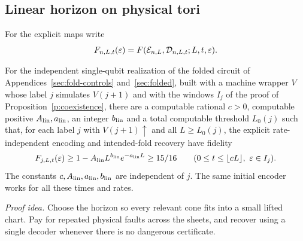 \subsection{Linear horizon on physical tori}

For the explicit maps write
\[
 F_{n,L,t}(\varepsilon)=F(\mathcal E_{n,L},\mathcal D_{n,L,t};L,t,\varepsilon).
\]

\begin{proposition}\label{q:linear}
For the independent single-qubit realization of the folded circuit of
Appendices~\ref{sec:fold-controls} and~\ref{sec:folded}, built with a
machine wrapper \(V\) whose label \(j\) simulates \(V(j+1)\) and with
the windows \(I_j\) of the proof of Proposition~\ref{p:coexistence},
there are a computable rational \(c>0\), computable positive \(A_{\rm lin},a_{\rm lin}\),
an integer \(b_{\rm lin}\) and a total computable threshold \(L_0(j)\) such that,
for each label \(j\) with \(V(j+1)\uparrow\) and all \(L\ge L_0(j)\), the explicit
rate-independent encoding and intended-fold recovery have fidelity
\[
 F_{j,L,t}(\varepsilon)\ge1-A_{\rm lin}L^{b_{\rm lin}}e^{-a_{\rm lin}L}
 \ge15/16\qquad(0\le t\le\lfloor cL\rfloor,\ \varepsilon\in I_j).
\]
The constants \(c,A_{\rm lin},a_{\rm lin},b_{\rm lin}\) are independent of \(j\).
The same initial encoder works for all these times and rates.
\end{proposition}
\par\noindent\emph{Proof idea.} Choose the horizon so every relevant cone fits into a small lifted chart. Pay for repeated physical faults across the sheets, and recover using a single decoder whenever there is no dangerous certificate.

